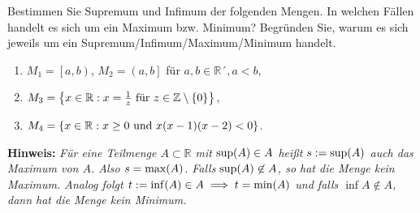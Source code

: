 \documentclass[german,12pt]{homework}
\newcommand{\ZZ}{\mathbb{Z}}
\newcommand{\RR}{\mathbb{R}}
\DeclarePairedDelimiter{\enbrace}{(}{)}
\DeclarePairedDelimiter{\penbrace}{\{}{\}}
\begin{document}
    \begin{problem}
        Bestimmen Sie Supremum und Infimum der folgenden Mengen. In welchen Fällen handelt es sich um ein Maximum bzw. Minimum? Begründen Sie, warum es sich jeweils um ein Supremum/Infimum/Maximum/Minimum handelt.
        \begin{enumerate}
            \item \(M_1 = \left[a, b\right)\), \(M_2 = \left(a, b\right]\) für \(a, b \in \RR´, a < b\),
            \item \(M_3 = \penbrace*{x \in \RR : x = \frac{1}{z}\text{ für }z \in \ZZ \setminus \penbrace*{0}}\),
            \item \(M_4 = \penbrace*{x \in \RR : x \ge 0\text{ und }x\enbrace*{x - 1}\enbrace*{x - 2} < 0}\).
        \end{enumerate}

        \textbf{Hinweis:} \quad \emph{Für eine Teilmenge \(A \subset \RR\) mit \(\sup\enbrace*{A} \in A\) heißt \(s := \sup\enbrace*{A}\) auch das Maximum von \(A\). Also \(s = \max\enbrace*{A}\). Falls \(\sup\enbrace*{A} \not\in A\), so hat die Menge kein Maximum. Analog folgt \(t := \inf\enbrace*{A} \in A \implies t = \min\enbrace*{A}\) und falls \(\inf{A} \not\in A\), dann hat die Menge kein Minimum.}
    \end{problem}
\end{document}
